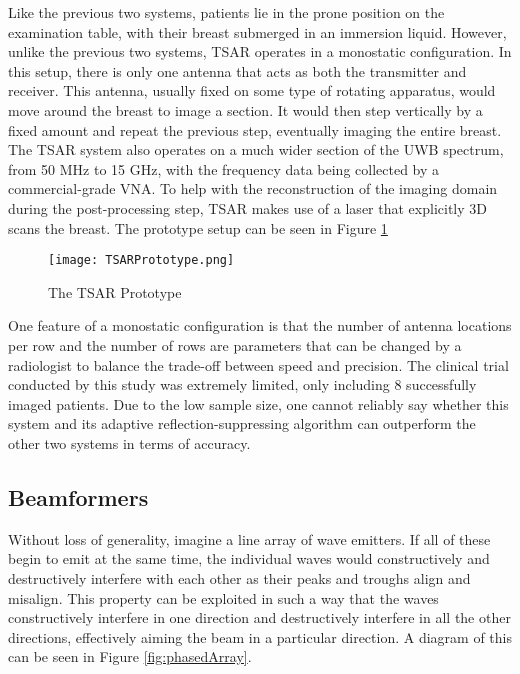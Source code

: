 Like the previous two systems, patients lie in the prone position on the examination table, with their breast submerged
in an immersion liquid. However, unlike the previous two systems, TSAR operates in a monostatic configuration. In this
setup, there is only one antenna that acts as both the transmitter and receiver. This antenna, usually fixed on some
type of rotating apparatus, would move around the breast to image a section. It would then step vertically by a fixed
amount and repeat the previous step, eventually imaging the entire breast. The TSAR system also operates on a much wider
section of the UWB spectrum, from 50 MHz to 15 GHz, with the frequency data being collected by a commercial-grade VNA.
To help with the reconstruction of the imaging domain during the post-processing step, TSAR makes use of a laser that
explicitly 3D scans the breast. The prototype setup can be seen in Figure \ref{fig:TSARPrototype} \hfill \break

\begin{figure}
    \texttt{[image: TSARPrototype.png]}
    \centering
    \caption{The TSAR Prototype \cite{bourquiPrototypeSystemMeasuring2012}}
    \label{fig:TSARPrototype}
\end{figure}

One feature of a monostatic configuration is that the number of antenna locations per row and the number of rows are
parameters that can be changed by a radiologist to balance the trade-off between speed and precision. The clinical trial
conducted by this study was extremely limited, only including 8 successfully imaged patients. Due to the low sample
size, one cannot reliably say whether this system and its adaptive reflection-suppressing algorithm can outperform the
other two systems in terms of accuracy. \hfill 

\subsection{Beamformers}
Without loss of generality, imagine a line array of wave emitters. If all of these begin to emit at the same time, the
individual waves would constructively and destructively interfere with each other as their peaks and troughs align and
misalign. This property can be exploited in such a way that the waves constructively interfere in one direction and
destructively interfere in all the other directions, effectively aiming the beam in a particular direction. A diagram
of this can be seen in Figure \ref{fig:phasedArray}.

